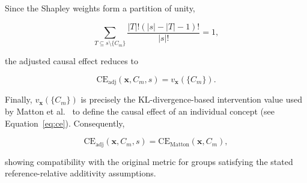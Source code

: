 \begin{math_box}[label=ma:independence_behavior]
    Since the Shapley weights form a partition of unity,

    \begin{equation}
        \sum_{T\subseteq s\setminus\{C_m\}}
        \frac{|T|!(|s|-|T|-1)!}{|s|!}
        =
        1,
    \end{equation}

    the adjusted causal effect reduces to

    \begin{equation}
        \mathrm{CE}_{\mathrm{adj}}(\mathbf{x},C_m,s)
        =
        v_{\mathbf{x}}(\{C_m\}).
    \end{equation}

    Finally, $v_{\mathbf{x}}(\{C_m\})$ is precisely the KL-divergence-based intervention value
    used by Matton et al.~\cite{mattonWalkTalkMeasuring2024} to define the causal
    effect of an individual concept (see Equation~\ref{eq:ce}). Consequently,

    \begin{equation}
        \mathrm{CE}_{\mathrm{adj}}(\mathbf{x},C_m,s)
        =
        \mathrm{CE}_{\mathrm{Matton}}(\mathbf{x},C_m),
    \end{equation}

    showing compatibility with the original metric for groups satisfying the stated
    reference-relative additivity assumptions.
\end{math_box}

